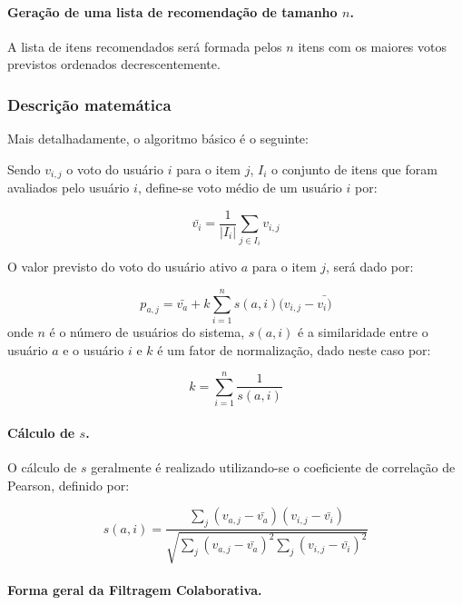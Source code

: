 \paragraph{Geração de uma lista de recomendação de tamanho $n$.}

A lista de itens recomendados será formada pelos $n$ itens com os maiores votos previstos ordenados decrescentemente.

\subsubsection{Descrição matemática}
Mais detalhadamente, o algoritmo básico é o seguinte:

Sendo $v_{i,j}$ o voto do usuário $i$ para o item $j$, $I_{i}$ o conjunto de itens que foram avaliados pelo usuário $i$, define-se voto médio de um usuário $i$ por:

\begin{equation}
 \bar{v_{i}} = \frac{1}{|I_{i}|} \sum_{j \in I_{i}} v_{i,j}
\end{equation}

O valor previsto do voto do usuário ativo $a$ para o item $j$, será dado por:

\begin{equation}
 p_{a,j} = \bar{v_{a}} + k\sum_{i=1}^n{s(a,i) (v_{i,j} - \bar{v_{i})}}
 \label{eq:filtragem_colaborativa_similaridade} 
\end{equation}
onde $n$ é o número de usuários do sistema, $s(a,i)$ é a similaridade entre o usuário $a$ e o usuário $i$ e $k$ é um fator de normalização, dado neste caso por:

\begin{equation}
 k = \sum_{i=1}^n{\frac{1}{s(a,i)}}
\end{equation}


\paragraph{Cálculo de $s$.}

O cálculo de $s$ geralmente é realizado utilizando-se o coeficiente de correlação de Pearson\cite{Breese98}, definido por:

\begin{equation}
 s(a,i) = \frac{\sum_{j}{(v_{a,j} - \bar{v_{a}}) (v_{i,j} - \bar{v_{i}})}}{\sqrt{\sum_{j}{(v_{a,j} - \bar{v_{a}})}^2\sum_{j}{(v_{i,j} - \bar{v_{i}})}^2}}
\end{equation}

\paragraph{Forma geral da Filtragem Colaborativa.}

